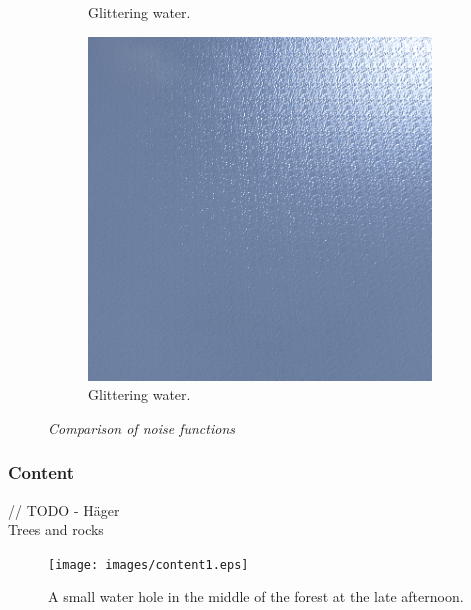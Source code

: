 \begin{figure}[H]
\begin{subfigure}{.5\textwidth}
  \caption{Glittering water.}
  \label{fig:waterGlistering}
\end{subfigure}
\begin{subfigure}{.5\textwidth}
  \centering
  \includegraphics[width=0.9\linewidth]{images/waterGlimmer.png}
  \caption{Glittering water.}
  \label{fig:waterGlistering}
\end{subfigure}
\caption[Noise comparison]{\textit{Comparison of noise functions}}
\label{fig:water}
\end{figure}

\subsubsection{Content}
// TODO - Häger \\
Trees and rocks 
\begin{figure}[H]
  \centering
  \texttt{[image: images/content1.eps]}
  \caption{A small water hole in the middle of the forest at the late afternoon.}
  \label{fig:water_hole}
\end{figure}%

